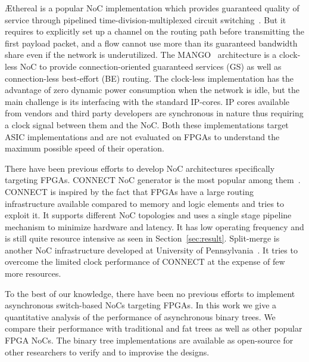 {\AE}thereal is a popular NoC implementation which provides guaranteed quality of service through pipelined time-division-multiplexed circuit switching~\cite{Goossens2005}.
But it requires to explicitly set up a channel on the routing path before transmitting the first payload packet, and a flow cannot use more than its guaranteed bandwidth share even if the network is underutilized.
The MANGO~\cite{Bjerregaard2006} architecture is a clock-less NoC to provide connection-oriented guaranteed services (GS) as well as connection-less best-effort (BE) routing.
The clock-less implementation has the advantage of zero dynamic power consumption when the network is idle, but the main challenge is its interfacing with the standard IP-cores.
IP cores available from vendors and third party developers are synchronous in nature thus requiring a clock signal between them and the NoC.
Both these implementations target ASIC implementations and are not evaluated on FPGAs to understand the maximum possible speed of their operation.

There have been previous efforts to develop NoC architectures specifically targeting FPGAs.
CONNECT NoC generator is the most popular among them~\cite{papa_connect_fpga2012}.
CONNECT is inspired by the fact that FPGAs have a large routing infrastructure available compared to memory and logic elements and tries to exploit it. 
It supports different NoC topologies and uses a single stage pipeline mechanism  to minimize hardware and latency. 
It has low operating frequency and is still quite resource intensive as seen in Section~\ref{sec:result}. 
Split-merge is another NoC infrastructure developed at University of Pennsylvania~\cite{Huan2012}.
It tries to overcome the limited clock performance of CONNECT at the expense of few more resources.

To the best of our knowledge, there have been no previous efforts to implement asynchronous switch-based NoCs targeting FPGAs. 
In this work we give a quantitative analysis of the performance of asynchronous binary trees.
We compare their performance with traditional and fat trees as well as other popular FPGA NoCs.
The binary tree implementations are available as open-source for other researchers to verify and to improvise the designs.